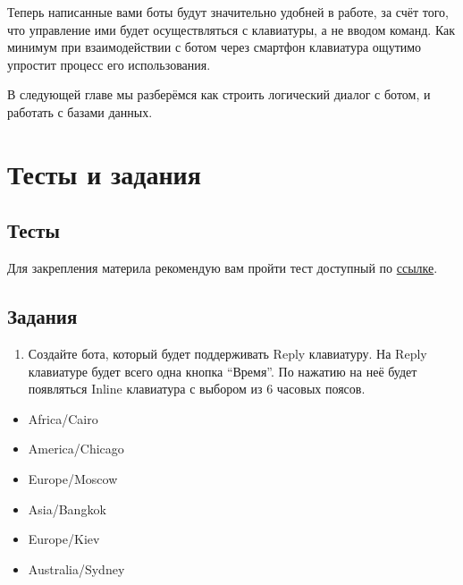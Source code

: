 \documentclass[
]{book}
\providecommand{\tightlist}{%
  \setlength{\itemsep}{0pt}\setlength{\parskip}{0pt}}
\begin{document}
Теперь написанные вами боты будут значительно удобней в работе, за счёт того, что управление ими будет осуществляться с клавиатуры, а не вводом команд. Как минимум при взаимодействии с ботом через смартфон клавиатура ощутимо упростит процесс его использования.

В следующей главе мы разберёмся как строить логический диалог с ботом, и работать с базами данных.

\hypertarget{ux442ux435ux441ux442ux44b-ux438-ux437ux430ux434ux430ux43dux438ux44f-2}{%
\section{Тесты и задания}\label{ux442ux435ux441ux442ux44b-ux438-ux437ux430ux434ux430ux43dux438ux44f-2}}

\hypertarget{ux442ux435ux441ux442ux44b-2}{%
\subsection{Тесты}\label{ux442ux435ux441ux442ux44b-2}}

Для закрепления материла рекомендую вам пройти тест доступный по \href{https://onlinetestpad.com/t/build-tg-bot-in-r-3}{ссылке}.

\hypertarget{ux437ux430ux434ux430ux43dux438ux44f-2}{%
\subsection{Задания}\label{ux437ux430ux434ux430ux43dux438ux44f-2}}

\begin{enumerate}
\def\labelenumi{\arabic{enumi}.}
\tightlist
\item
  Создайте бота, который будет поддерживать Reply клавиатуру. На Reply клавиатуре будет всего одна кнопка ``Время''. По нажатию на неё будет появляться Inline клавиатура с выбором из 6 часовых поясов.
\end{enumerate}

\begin{itemize}
\tightlist
\item
  Africa/Cairo
\item
  America/Chicago
\item
  Europe/Moscow
\item
  Asia/Bangkok
\item
  Europe/Kiev
\item
  Australia/Sydney
\end{itemize}
\end{document}
